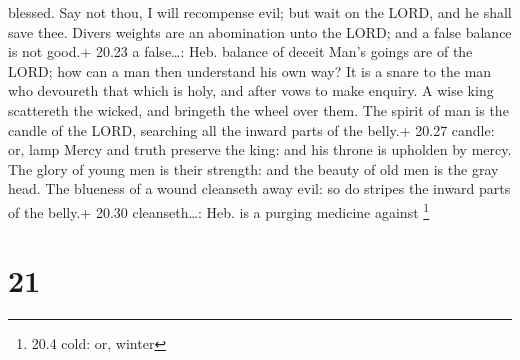 blessed.  Say not thou, I will recompense evil; but wait on
the LORD, and he shall save thee.  Divers weights are an
abomination unto the LORD; and a false balance is not good.+ 20.23 a
false\ldots: Heb. balance of deceit  Man's goings are of
the LORD; how can a man then understand his own way?  It is
a snare to the man who devoureth that which is holy, and after vows to
make enquiry.  A wise king scattereth the wicked, and
bringeth the wheel over them.  The spirit of man is the
candle of the LORD, searching all the inward parts of the belly.+ 20.27
candle: or, lamp  Mercy and truth preserve the king: and
his throne is upholden by mercy.  The glory of young men is
their strength: and the beauty of old men is the gray head.
 The blueness of a wound cleanseth away evil: so do stripes
the inward parts of the belly.+ 20.30 cleanseth\ldots: Heb. is a purging
medicine against \footnote{20.4 cold: or, winter}

\hypertarget{section-20}{%
\section{21}\label{section-20}}

